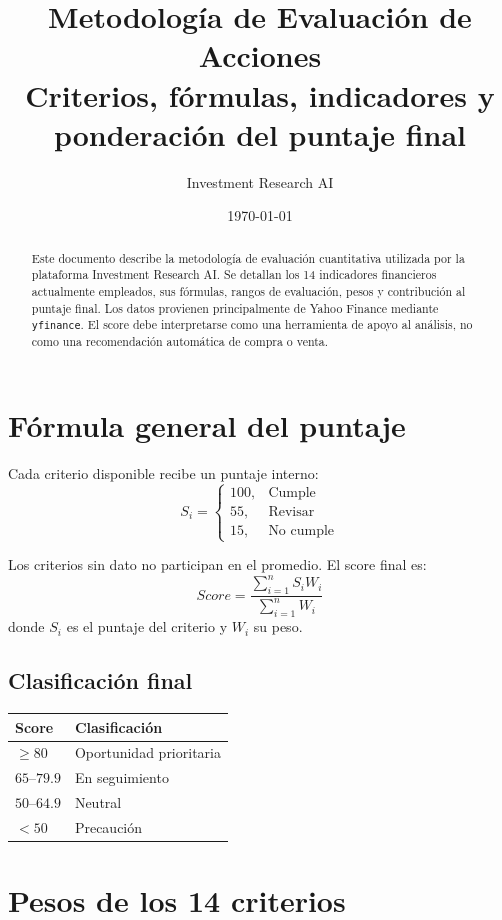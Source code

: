 \documentclass[11pt,a4paper]{article}
\title{\textbf{Metodología de Evaluación de Acciones}\\
\large Criterios, fórmulas, indicadores y ponderación del puntaje final}
\author{Investment Research AI}
\date{\today}
\begin{document}
\maketitle

\begin{abstract}
Este documento describe la metodología de evaluación cuantitativa utilizada por la plataforma Investment Research AI. Se detallan los 14 indicadores financieros actualmente empleados, sus fórmulas, rangos de evaluación, pesos y contribución al puntaje final. Los datos provienen principalmente de Yahoo Finance mediante \texttt{yfinance}. El score debe interpretarse como una herramienta de apoyo al análisis, no como una recomendación automática de compra o venta.
\end{abstract}

\tableofcontents
\newpage

\section{Fórmula general del puntaje}

Cada criterio disponible recibe un puntaje interno:
\[
S_i=
\begin{cases}
100, & \text{Cumple}\\
55, & \text{Revisar}\\
15, & \text{No cumple}
\end{cases}
\]

Los criterios sin dato no participan en el promedio. El score final es:
\[
\boxed{
Score=
\frac{\sum_{i=1}^{n} S_iW_i}
{\sum_{i=1}^{n}W_i}
}
\]
donde $S_i$ es el puntaje del criterio y $W_i$ su peso.

\subsection{Clasificación final}
\begin{center}
\begin{tabular}{ll}
\toprule
\textbf{Score} & \textbf{Clasificación}\\
\midrule
$\geq 80$ & Oportunidad prioritaria\\
$65$--$79.9$ & En seguimiento\\
$50$--$64.9$ & Neutral\\
$<50$ & Precaución\\
\bottomrule
\end{tabular}
\end{center}

\section{Pesos de los 14 criterios}
\end{document}
